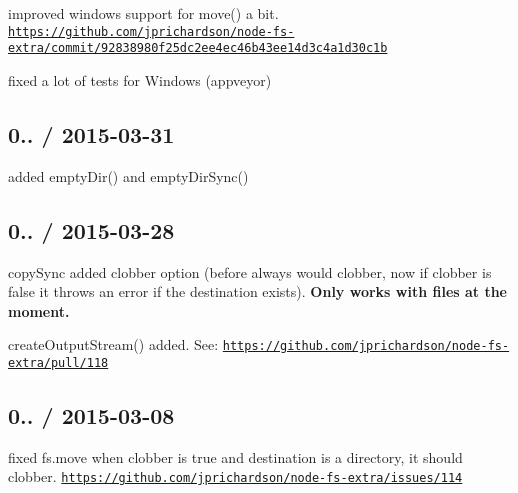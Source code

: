 \begin{DoxyItemize}
\item improved windows support for {\ttfamily move()} a bit. \href{https://github.com/jprichardson/node-fs-extra/commit/92838980f25dc2ee4ec46b43ee14d3c4a1d30c1b}{\tt https\+://github.\+com/jprichardson/node-\/fs-\/extra/commit/92838980f25dc2ee4ec46b43ee14d3c4a1d30c1b}
\item fixed a lot of tests for Windows (appveyor)
\end{DoxyItemize}

\subsection*{0.. / 2015-\/03-\/31 }


\begin{DoxyItemize}
\item added {\ttfamily empty\+Dir()} and {\ttfamily empty\+Dir\+Sync()}
\end{DoxyItemize}

\subsection*{0.. / 2015-\/03-\/28 }


\begin{DoxyItemize}
\item {\ttfamily copy\+Sync} added {\ttfamily clobber} option (before always would clobber, now if {\ttfamily clobber} is {\ttfamily false} it throws an error if the destination exists). {\bfseries Only works with files at the moment.}
\item {\ttfamily create\+Output\+Stream()} added. See\+: \href{https://github.com/jprichardson/node-fs-extra/pull/118}{\tt https\+://github.\+com/jprichardson/node-\/fs-\/extra/pull/118}
\end{DoxyItemize}

\subsection*{0.. / 2015-\/03-\/08 }


\begin{DoxyItemize}
\item fixed {\ttfamily fs.\+move} when {\ttfamily clobber} is {\ttfamily true} and destination is a directory, it should clobber. \href{https://github.com/jprichardson/node-fs-extra/issues/114}{\tt https\+://github.\+com/jprichardson/node-\/fs-\/extra/issues/114}
\end{DoxyItemize}

